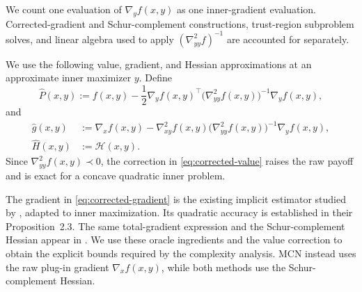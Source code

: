 We count one evaluation of $\nabla_yf(x,y)$ as one inner-gradient
evaluation. Corrected-gradient and Schur-complement constructions,
trust-region subproblem solves, and linear algebra used to apply
$(\nabla^2_{yy}f)^{-1}$ are accounted for separately.

We use the following value, gradient, and Hessian approximations
at an approximate inner maximizer $y$. Define
\begin{equation}
    \widehat P(x,y)
    :=
    f(x,y)
    -
    \frac12
    \nabla_yf(x,y)^\top
    \bigl(\nabla^2_{yy}f(x,y)\bigr)^{-1}
    \nabla_yf(x,y),
    \label{eq:corrected-value}
\end{equation}
and
\begin{subequations}
\label{eq:corrected-derivatives}
\begin{align}
    \widehat g(x,y)
    &:=
    \nabla_xf(x,y)
    -
    \nabla^2_{xy}f(x,y)
    \bigl(\nabla^2_{yy}f(x,y)\bigr)^{-1}
    \nabla_yf(x,y),
    \label{eq:corrected-gradient}
    \\
    \widehat H(x,y)
    &:=
    \mathcal H(x,y).
    \label{eq:corrected-hessian}
\end{align}
\end{subequations}
Since $\nabla^2_{yy}f(x,y)\prec0$, the correction in
\eqref{eq:corrected-value} raises the raw payoff and is exact for a
concave quadratic inner problem.

The gradient in \eqref{eq:corrected-gradient} is the existing
implicit estimator studied by \citet{ablin2020superefficiency},
adapted to inner maximization. Its quadratic accuracy is established
in their Proposition~2.3. The same total-gradient expression and
the Schur-complement Hessian appear in \citet{zhang2020newton}.
We use these oracle ingredients and the value correction to obtain
the explicit bounds required by the complexity analysis.
MCN instead uses the raw plug-in gradient $\nabla_xf(x,y)$, while
both methods use the Schur-complement Hessian.


